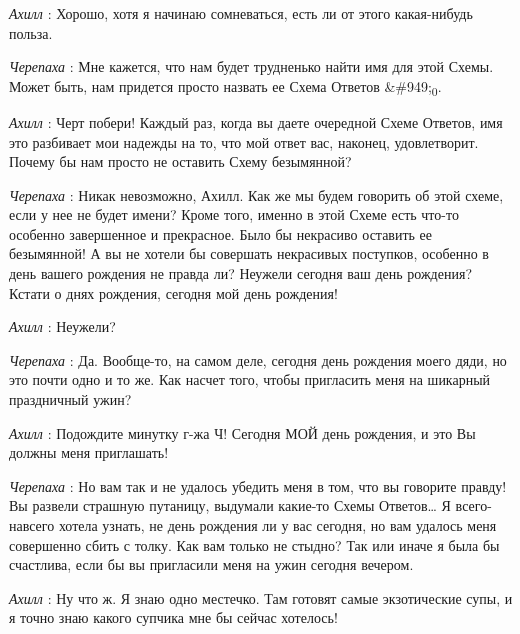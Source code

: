 \emph{Ахилл} : Хорошо, хотя я начинаю сомневаться, есть ли от этого какая-нибудь польза.

\emph{Черепаха} : Мне кажется, что нам будет трудненько найти имя для этой Схемы. Может быть, нам придется просто назвать ее Схема Ответов \&\#949;\textsubscript{0}.

\emph{Ахилл} : Черт побери! Каждый раз, когда вы даете очередной Схеме Ответов, имя это разбивает мои надежды на то, что мой ответ вас, наконец, удовлетворит. Почему бы нам просто не оставить Схему безымянной?

\emph{Черепаха} : Никак невозможно, Ахилл. Как же мы будем говорить об этой схеме, если у нее не будет имени? Кроме того, именно в этой Схеме есть что-то особенно завершенное и прекрасное. Было бы некрасиво оставить ее безымянной! А вы не хотели бы совершать некрасивых поступков, особенно в день вашего рождения не правда ли? Неужели сегодня ваш день рождения? Кстати о днях рождения, сегодня мой день рождения!

\emph{Ахилл} : Неужели?

\emph{Черепаха} : Да. Вообще-то, на самом деле, сегодня день рождения моего дяди, но это почти одно и то же. Как насчет того, чтобы пригласить меня на шикарный праздничный ужин?

\emph{Ахилл} : Подождите минутку г-жа Ч! Сегодня МОЙ день рождения, и это Вы должны меня приглашать!

\emph{Черепаха} : Но вам так и не удалось убедить меня в том, что вы говорите правду! Вы развели страшную путаницу, выдумали какие-то Схемы Ответов\ldots{} Я всего-навсего хотела узнать, не день рождения ли у вас сегодня, но вам удалось меня совершенно сбить с толку. Как вам только не стыдно? Так или иначе я была бы счастлива, если бы вы пригласили меня на ужин сегодня вечером.

\emph{Ахилл} : Ну что ж. Я знаю одно местечко. Там готовят самые экзотические супы, и я точно знаю какого супчика мне бы сейчас хотелось!

